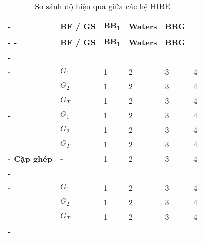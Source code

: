 \begin{longtabu}{| >{\bfseries\centering}p{2cm} | >{\bfseries\centering}p{0.5cm} | X[c] X[c] X[c] X[c] |}
	\caption{So sánh độ hiệu quả giữa các hệ HIBE} \\
	\tabucline[4pt]-
	 &
	\bfseries BF / GS \newline &
	\bfseries BB\textsubscript{1} &
	\bfseries Waters &
	\bfseries BBG \\
	\tabucline[2pt]-
	\endfirsthead
	\tabucline[4pt]-
	 &
	\bfseries BF / GS \newline &
	\bfseries BB\textsubscript{1} &
	\bfseries Waters &
	\bfseries BBG \\
	\tabucline[2pt]-
	\endhead
	 \\
	\tabucline[1pt]-
	 \newline & $G_1$ & 1 & 2 & 3 & 4 \\
	& $G_2$ \newline & 1 & 2 & 3 & 4 \\
	& $G_T$ \newline & 1 & 2 & 3 & 4 \\
	\tabucline[1pt]-
	 \newline & $G_1$ & 1 & 2 & 3 & 4 \\
	& $G_2$ \newline & 1 & 2 & 3 & 4 \\
	& $G_T$ \newline & 1 & 2 & 3 & 4 \\
	\tabucline[1pt]-
	Cặp ghép \newline & - & 1 & 2 & 3 & 4 \\
	\tabucline[2pt]-
	 \\
	\tabucline[1pt]-
	 \newline & $G_1$ & 1 & 2 & 3 & 4 \\
	& $G_2$ \newline & 1 & 2 & 3 & 4 \\
	& $G_T$ \newline & 1 & 2 & 3 & 4 \\
	\tabucline[1pt]-

\end{longtabu}
